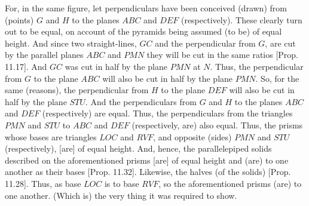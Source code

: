 \begin{Parallel}{}{}
{For, in the same figure, let perpendiculars have been conceived (drawn) from (points)
$G$ and $H$ to the planes $ABC$ and $DEF$ (respectively). These clearly turn
out to be equal, on account of the pyramids being assumed (to be) of equal height. And
since two straight-lines, $GC$ and the perpendicular from $G$, are cut by the parallel
planes $ABC$ and $PMN$ they will be cut in the same ratios [Prop. 11.17]. And $GC$ was cut in half by the plane $PMN$ at $N$. Thus, the perpendicular
from $G$ to the plane $ABC$ will also be cut in half by the plane $PMN$. So, for the same
(reasons), the perpendicular from $H$ to the plane $DEF$ will also be cut in half by the
plane $STU$. And  the perpendiculars from $G$ and $H$ to the planes $ABC$ and $DEF$
(respectively) are equal. Thus, the perpendiculars from the triangles $PMN$ and $STU$
to $ABC$ and $DEF$ (respectively, are) also equal. Thus, the prisms whose bases are triangles
$LOC$ and $RVF$, and opposite (sides) $PMN$ and $STU$ (respectively), [are] of equal height.
And, hence, the parallelepiped solids described on the aforementioned prisms
[are] of equal height and (are) to one another as their bases [Prop. 11.32]. Likewise, the halves (of
the solids) [Prop. 11.28].  Thus, as base $LOC$ is to base $RVF$, so the
aforementioned prisms (are) to one another. (Which is) the very thing it was required to show.}
\end{Parallel}

